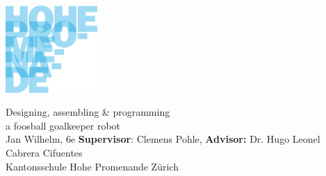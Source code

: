 \documentclass[paperheight=140cm,paperwidth=100cm,portrait]{./baposter}
\begin{document}
\begin{poster}
{        \noindent
        \begin{minipage}{.1\linewidth}
            \includegraphics[width=3.5cm]{../../photos/hopro_logo}
        \end{minipage}%
        \begin{minipage}{.05\linewidth}
        \end{minipage}
        \begin{minipage}{.9\linewidth}
            \centering
            \textsf{
                \fontsize{30}{8}\selectfont
                Designing, assembling \& programming \\a foosball goalkeeper robot
            }\\
            \sf\vspace{0.5em}
            \fontsize{18}{8}\selectfont
            Jan Wilhelm, 6e \hspace{0.3cm} \textbf{Supervisor}: Clemens Pohle, \textbf{Advisor:} Dr. Hugo Leonel Cabrera Cifuentes\\ \vspace{0.5cm} \selectfont Kantonsschule Hohe Promenande Zürich
        \end{minipage}
        \vspace{1cm}

    } %
    {
    }


\end{poster}
\end{document}
